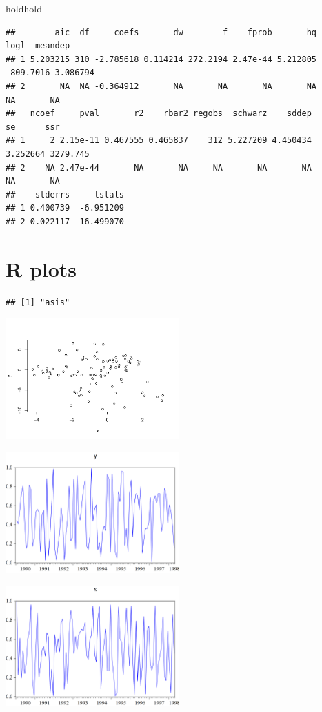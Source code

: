 \documentclass[
]{article}
\begin{document}
holdhold

\begin{verbatim}
##        aic  df     coefs       dw        f    fprob       hq      logl  meandep
## 1 5.203215 310 -2.785618 0.114214 272.2194 2.47e-44 5.212805 -809.7016 3.086794
## 2       NA  NA -0.364912       NA       NA       NA       NA        NA       NA
##   ncoef     pval       r2    rbar2 regobs  schwarz    sddep       se      ssr
## 1     2 2.15e-11 0.467555 0.465837    312 5.227209 4.450434 3.252664 3279.745
## 2    NA 2.47e-44       NA       NA     NA       NA       NA       NA       NA
##    stderrs     tstats
## 1 0.400739  -6.951209
## 2 0.022117 -16.499070
\end{verbatim}

\hypertarget{r-plots}{%
\section{R plots}\label{r-plots}}

\begin{verbatim}
## [1] "asis"
\end{verbatim}

\begin{center}\includegraphics[width=0.5\textwidth]{test_engEviews_files/figure-latex/label-1} \end{center}

\begin{center}\includegraphics[width=0.5\textwidth]{EViewsR_files/eview-graph-y} \end{center}

\begin{center}\includegraphics[width=0.5\textwidth]{EViewsR_files/eview-graph-x} \end{center}
\end{document}
